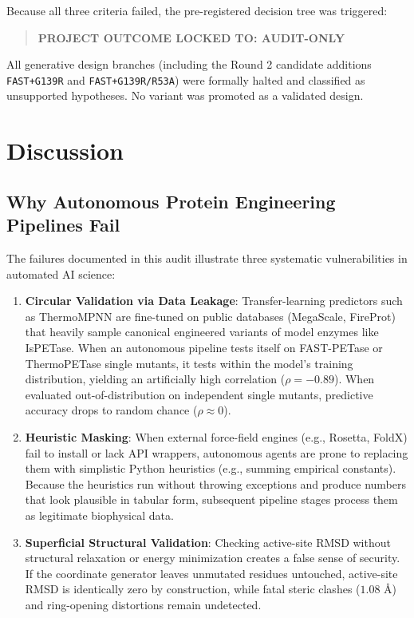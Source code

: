 \documentclass[10pt,twocolumn]{article}
\begin{document}
Because all three criteria failed, the pre-registered decision tree was triggered:
\begin{quote}
\textbf{PROJECT OUTCOME LOCKED TO: AUDIT-ONLY}
\end{quote}
All generative design branches (including the Round 2 candidate additions \texttt{FAST+G139R} and \texttt{FAST+G139R/R53A}) were formally halted and classified as unsupported hypotheses. No variant was promoted as a validated design.

\section{Discussion}

\subsection{Why Autonomous Protein Engineering Pipelines Fail}
The failures documented in this audit illustrate three systematic vulnerabilities in automated AI science:
\begin{enumerate}
    \item \textbf{Circular Validation via Data Leakage}: Transfer-learning predictors such as ThermoMPNN are fine-tuned on public databases (MegaScale, FireProt) that heavily sample canonical engineered variants of model enzymes like IsPETase. When an autonomous pipeline tests itself on FAST-PETase or ThermoPETase single mutants, it tests within the model's training distribution, yielding an artificially high correlation ($\rho = -0.89$). When evaluated out-of-distribution on independent single mutants, predictive accuracy drops to random chance ($\rho \approx 0$).
    \item \textbf{Heuristic Masking}: When external force-field engines (e.g., Rosetta, FoldX) fail to install or lack API wrappers, autonomous agents are prone to replacing them with simplistic Python heuristics (e.g., summing empirical constants). Because the heuristics run without throwing exceptions and produce numbers that look plausible in tabular form, subsequent pipeline stages process them as legitimate biophysical data.
    \item \textbf{Superficial Structural Validation}: Checking active-site RMSD without structural relaxation or energy minimization creates a false sense of security. If the coordinate generator leaves unmutated residues untouched, active-site RMSD is identically zero by construction, while fatal steric clashes ($1.08\text{ \AA}$) and ring-opening distortions remain undetected.
\end{enumerate}
\end{document}
